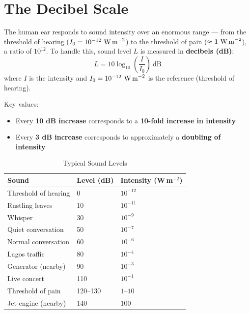 \section{The Decibel Scale}

\begin{definitionbox}
The human ear responds to sound intensity over an
enormous range --- from the threshold of hearing
($I_0 = 10^{-12}\ \text{W\,m}^{-2}$) to the threshold
of pain ($\approx 1\ \text{W\,m}^{-2}$), a ratio of
$10^{12}$. To handle this, sound level $L$ is measured
in \textbf{decibels (dB)}:
\[
  L = 10\log_{10}\left(\frac{I}{I_0}\right)\ \text{dB}
\]
where $I$ is the intensity and $I_0 = 10^{-12}\ \text{W\,m}^{-2}$
is the reference (threshold of hearing).

Key values:
\begin{itemize}[noitemsep]
  \item Every \textbf{10 dB increase} corresponds to
  a \textbf{10-fold increase in intensity}
  \item Every \textbf{3 dB increase} corresponds to
  approximately a \textbf{doubling of intensity}
\end{itemize}
\end{definitionbox}

\begin{table}[H]
\centering
\caption{Typical Sound Levels}
\label{tab:sound_levels}
\begin{tabular}{lll}
\toprule
\textbf{Sound} & \textbf{Level (dB)} &
\textbf{Intensity (W\,m$^{-2}$)}\\
\midrule
Threshold of hearing & 0 & $10^{-12}$\\
Rustling leaves & 10 & $10^{-11}$\\
Whisper & 30 & $10^{-9}$\\
Quiet conversation & 50 & $10^{-7}$\\
Normal conversation & 60 & $10^{-6}$\\
Lagos traffic & 80 & $10^{-4}$\\
Generator (nearby) & 90 & $10^{-3}$\\
Live concert & 110 & $10^{-1}$\\
Threshold of pain & 120--130 & $1$--$10$\\
Jet engine (nearby) & 140 & $100$\\
\bottomrule
\end{tabular}
\end{table}

